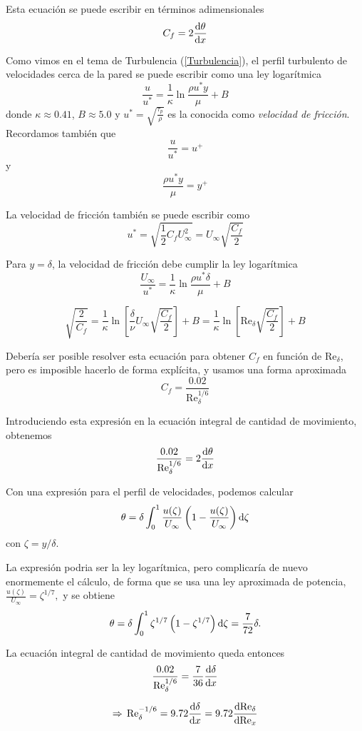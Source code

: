 	Esta ecuación se puede escribir en términos adimensionales 
	\[
	C_{f}=2\frac{\textrm{d} \theta}{\textrm{d} x}
	\]
	
	Como vimos en el tema de Turbulencia (\ref{Turbulencia}), el perfil turbulento de velocidades
	cerca de la pared se puede escribir como una ley logarítmica 
	\[
	\frac{u}{u^{*}}=\frac{1}{\kappa}\ln\frac{\rho u^{*}y}{\mu}+B
	\]
	donde $\kappa \approx 0.41$, $B \approx 5.0$ y $u^{*}=\sqrt{\frac{\tau_{p}}{\rho}}$ es
	la conocida como \textit{velocidad de fricción}. Recordamos también que \[\frac{u}{u^*} = u^+\] y 
	\[\frac{\rho u^{*}y}{\mu} = y^+\]

	
	La velocidad de fricción también se puede escribir como 
	\[
	u^{*}=\sqrt{\frac{1}{2}C_{f}U_{\infty}^{2}}=U_{\infty}\sqrt{\frac{C_{f}}{2}}
	\]
	
	Para $y=\delta$, la velocidad de fricción debe cumplir la ley logarítmica
	\[
	\frac{U_{\infty}}{u^{*}}=\frac{1}{\kappa}\ln\frac{\rho u^{*}\delta}{\mu}+B
	\]
	
	\[
	\sqrt{\frac{2}{C_{f}}}=\frac{1}{\kappa}\ln\left[\frac{\delta}{\nu}U_{\infty}\sqrt{\frac{C_{f}}{2}}\right]+B=\frac{1}{\kappa}\ln\left[\text{Re}_{\delta}\sqrt{\frac{C_{f}}{2}}\right]+B
	\]
	
	Debería ser posible resolver esta ecuación para obtener $C_{f}$ en
	función de $\text{Re}_{\delta}$, pero es imposible hacerlo de forma
	explícita, y usamos una forma aproximada 
	\[
	C_{f}=\frac{0.02}{\text{Re}_{\delta}^{1/6}}
	\]
	

	
	Introduciendo esta expresión en la ecuación integral de cantidad de
	movimiento, obtenemos 
	\[
	\frac{0.02}{\text{Re}_{\delta}^{1/6}}=2\frac{\textrm{d} \theta}{\textrm{d} x}
	\]
	
	Con una expresión para el perfil de velocidades, podemos calcular
	\[
	\theta=\delta\int_{0}^{1}\frac{u(\zeta)}{U_{\infty}}\left(1-\frac{u(\zeta)}{U_{\infty}}\right)\text{d}\zeta
	\]
	con $\zeta=y/\delta$. 
	
	La expresión podria ser la ley logarítmica, pero complicaría de nuevo
	enormemente el cálculo, de forma que se usa una ley aproximada de
	potencia, $\frac{u(\zeta)}{U_{\infty}}=\zeta^{1/7},$ y se obtiene
	\[
	\theta=\delta\int_{0}^{1}\zeta^{1/7}\left(1-\zeta^{1/7}\right)\text{d}\zeta=\frac{7}{72}\delta.
	\]
	

	
	La ecuación integral de cantidad de movimiento queda entonces 
	\[
	\frac{0.02}{\text{Re}_{\delta}^{1/6}}=\frac{7}{36}\frac{\textrm{d} \delta}{\textrm{d} x}
	\]
	
	\[
	\Rightarrow\,\text{Re}_{\delta}^{-1/6}=9.72\frac{\textrm{d} \delta}{\textrm{d} x}=9.72\frac{\textrm{d} \text{Re}_{\delta}}{\textrm{d} \text{Re}_{x}}
	\]
	
